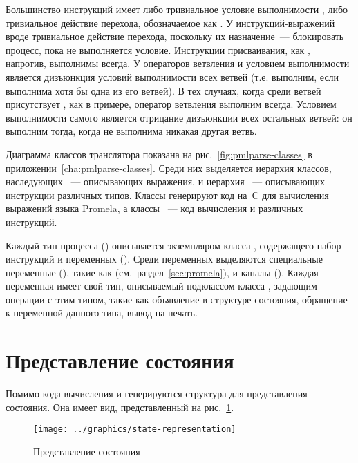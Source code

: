 Большинство инструкций имеет либо тривиальное условие выполнимости , либо
тривиальное действие перехода, обозначаемое как . У инструкций-выражений вроде
 тривиальное действие перехода, поскольку их назначение~--- блокировать
процесс, пока не выполняется условие. Инструкции присваивания, как , напротив,
выполнимы всегда. У операторов ветвления  и  условием выполнимости
является дизъюнкция условий выполнимости всех ветвей (т.е.  выполним, если
выполнима хотя бы одна из его ветвей). В тех случаях, когда среди ветвей присутствует
, как в примере, оператор ветвления выполним всегда. Условием выполнимости
самого  является отрицание дизъюнкции всех остальных ветвей: он выполним тогда,
когда не выполнима никакая другая ветвь.  

Диаграмма классов транслятора показана на рис.~\ref{fig:pmlparse-classes} в
приложении~\ref{cha:pmlparse-classes}. Среди них выделяется иерархия классов, наследующих
~--- описывающих выражения, и иерархия ~--- описывающих
инструкции различных типов. Классы  генерируют код на~C для вычисления
выражений языка Promela, а классы ~--- код вычисления  и
 различных инструкций.

Каждый тип процесса () описывается экземпляром класса ,
содержащего набор инструкций и переменных (). Среди переменных выделяются
специальные переменные (), такие как 
(см.~раздел~\ref{sec:promela}), и каналы (). Каждая переменная имеет свой
тип, описываемый подклассом класса , задающим операции с этим типом, такие как
объявление в структуре состояния, обращение к переменной данного типа, вывод на
печать\etc.

\section{Представление состояния}
\label{sec:state-represent}

Помимо кода вычисления  и  генерируются структура 
для представления состояния. Она имеет вид, представленный на рис.~\ref{fig:state-repr}.

\begin{figure}[ht]
  \centering
  \texttt{[image: ../graphics/state-representation]}  
  \caption{Представление состояния}
  \label{fig:state-repr}
\end{figure}

